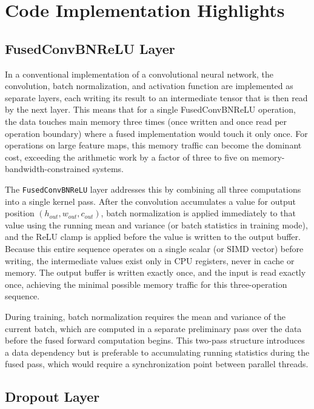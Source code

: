 \documentclass[12pt,oneside,a4paper]{report}
\begin{document}
\section{Code Implementation Highlights}

\subsection{FusedConvBNReLU Layer}

In a conventional implementation of a convolutional neural network, the convolution, batch normalization, and activation function are implemented as separate layers, each writing its result to an intermediate tensor that is then read by the next layer. This means that for a single FusedConvBNReLU operation, the data touches main memory three times (once written and once read per operation boundary) where a fused implementation would touch it only once. For operations on large feature maps, this memory traffic can become the dominant cost, exceeding the arithmetic work by a factor of three to five on memory-bandwidth-constrained systems.

The \texttt{FusedConvBNReLU} layer addresses this by combining all three computations into a single kernel pass. After the convolution accumulates a value for output position $(h_{out}, w_{out}, c_{out})$, batch normalization is applied immediately to that value using the running mean and variance (or batch statistics in training mode), and the ReLU clamp is applied before the value is written to the output buffer. Because this entire sequence operates on a single scalar (or SIMD vector) before writing, the intermediate values exist only in CPU registers, never in cache or memory. The output buffer is written exactly once, and the input is read exactly once, achieving the minimal possible memory traffic for this three-operation sequence.

During training, batch normalization requires the mean and variance of the current batch, which are computed in a separate preliminary pass over the data before the fused forward computation begins. This two-pass structure introduces a data dependency but is preferable to accumulating running statistics during the fused pass, which would require a synchronization point between parallel threads.

\subsection{Dropout Layer}
\end{document}
